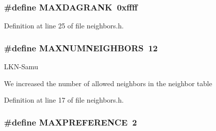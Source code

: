 \subsubsection[{\texorpdfstring{M\+A\+X\+D\+A\+G\+R\+A\+NK}{MAXDAGRANK}}]{\setlength{\rightskip}{0pt plus 5cm}\#define M\+A\+X\+D\+A\+G\+R\+A\+NK~0xffff}\hypertarget{group___neighbors_gaec4751ff896721a5a0fd70b841d09724}{}\label{group___neighbors_gaec4751ff896721a5a0fd70b841d09724}


Definition at line 25 of file neighbors.\+h.

\subsubsection[{\texorpdfstring{M\+A\+X\+N\+U\+M\+N\+E\+I\+G\+H\+B\+O\+RS}{MAXNUMNEIGHBORS}}]{\setlength{\rightskip}{0pt plus 5cm}\#define M\+A\+X\+N\+U\+M\+N\+E\+I\+G\+H\+B\+O\+RS~12}\hypertarget{group___neighbors_gaf83606573bb704d34705b540c226a0d9}{}\label{group___neighbors_gaf83606573bb704d34705b540c226a0d9}
\begin{DoxyRefDesc}{L\+K\+N-\/\+Samu}
\item[\hyperlink{_l_k_n_code_edits__LKN_code_edits000017}{L\+K\+N-\/\+Samu}]We increased the number of allowed neighbors in the neighbor table \end{DoxyRefDesc}


Definition at line 17 of file neighbors.\+h.

\subsubsection[{\texorpdfstring{M\+A\+X\+P\+R\+E\+F\+E\+R\+E\+N\+CE}{MAXPREFERENCE}}]{\setlength{\rightskip}{0pt plus 5cm}\#define M\+A\+X\+P\+R\+E\+F\+E\+R\+E\+N\+CE~2}\hypertarget{group___neighbors_ga6a269e3fd9f5dc2fe01c351944352799}{}\label{group___neighbors_ga6a269e3fd9f5dc2fe01c351944352799}


